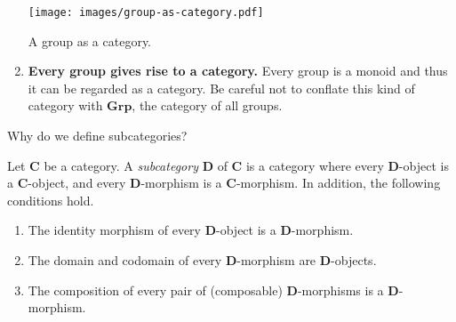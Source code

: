 \begin{example}
\begin{enumerate}[label=\arabic*.]
    \begin{marginfigure}[3\baselineskip]
        \captionsetup{type=figure}
        \centering
        \texttt{[image: images/group-as-category.pdf]}\vspace{\baselineskip}
        \caption{A group as a category.}
    \end{marginfigure}
    \item \textbf{Every group gives rise to a  category.}
    Every group is a monoid and thus it can be regarded as a category.
    Be careful not to conflate this  kind of category   with \(\mathbf{Grp}\), the category of all groups.

    
\end{enumerate}
\end{example}

Why do we define subcategories?

\begin{definition}[Subcategories]
    Let \(\mathbf{C}\) be a category. 
    A \textit{subcategory} \(\mathbf{D}\) of \(\mathbf{C}\) is a category  where every  \(\mathbf{D}\)-object is a \(\mathbf{C}\)-object, and every  \(\mathbf{D}\)-morphism is a \(\mathbf{C}\)-morphism. In addition, the following conditions hold. 
    \begin{enumerate}[label=(\roman*)]
        \item The identity morphism of every \(\mathbf{D}\)-object is a \(\mathbf{D}\)-morphism.
        \item The domain and codomain of every \(\mathbf{D}\)-morphism are \(\mathbf{D}\)-objects.
        \item The composition of every pair of (composable) \(\mathbf{D}\)-morphisms is a \(\mathbf{D}\)-morphism.
    \end{enumerate}
    
\end{definition}

